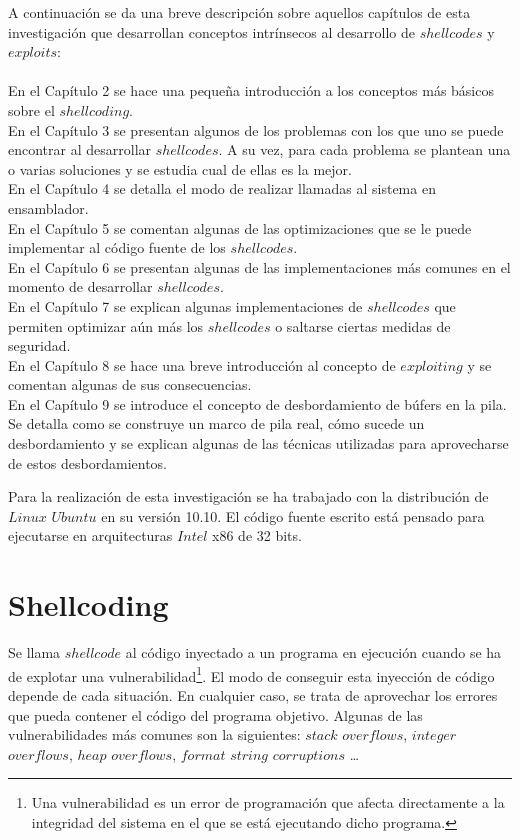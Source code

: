 \documentclass [titlepage, 12pt]{article}
\begin{document}
A continuaci\'on se da una breve descripci\'on sobre aquellos cap\'itulos de esta investigaci\'on que desarrollan conceptos intr\'insecos al desarrollo de $shellcodes$ y $exploits$:\\
\\
En el Cap\'itulo 2 se hace una peque\~na introducci\'on a los conceptos m\'as b\'asicos sobre el $shellcoding$.\\
En el Cap\'itulo 3 se presentan algunos de los problemas con los que uno se puede encontrar al desarrollar $shellcodes$. A su vez, para cada problema se plantean una o varias soluciones y se estudia cual de ellas es la mejor.\\
En el Cap\'itulo 4 se detalla el modo de realizar llamadas al sistema en ensamblador.\\
En el Cap\'itulo 5 se comentan algunas de las optimizaciones que se le puede implementar al c\'odigo fuente de los $shellcodes$.\\
En el Cap\'itulo 6 se presentan algunas de las implementaciones m\'as comunes en el momento de desarrollar $shellcodes$.\\
En el Cap\'itulo 7 se explican algunas implementaciones de $shellcodes$ que permiten optimizar a\'un m\'as los $shellcodes$ o saltarse ciertas medidas de seguridad.\\
En el Cap\'itulo 8 se hace una breve introducci\'on al concepto de $exploiting$ y se comentan algunas de sus consecuencias.\\
En el Cap\'itulo 9 se introduce el concepto de desbordamiento de b\'ufers en la pila. Se detalla como se construye un marco de pila real, c\'omo sucede un desbordamiento y se explican algunas de las t\'ecnicas utilizadas para aprovecharse de estos desbordamientos.\bigskip

Para la realizaci\'on de esta investigaci\'on se ha trabajado con la distribuci\'on de $Linux$ $Ubuntu$ en su versi\'on 10.10. El c\'odigo fuente escrito est\'a pensado para ejecutarse en arquitecturas $Intel$ x86 de 32 bits.



\pagebreak

\section {Shellcoding}
Se llama $shellcode$ al c\'odigo inyectado a un programa en ejecuci\'on cuando se ha de explotar una vulnerabilidad\footnote{Una vulnerabilidad es un error de programaci\'on que afecta directamente a la integridad del sistema en el que se est\'a ejecutando dicho programa.}. El modo de conseguir esta inyecci\'on de c\'odigo depende de cada situaci\'on. En cualquier caso, se trata de aprovechar los errores que pueda contener el c\'odigo del programa objetivo. Algunas de las vulnerabilidades m\'as comunes son la siguientes: $stack$ $overflows$, $integer$ $overflows$, $heap$ $overflows$, $format$ $string$ $corruptions$ \ldots \bigskip
\end{document}
